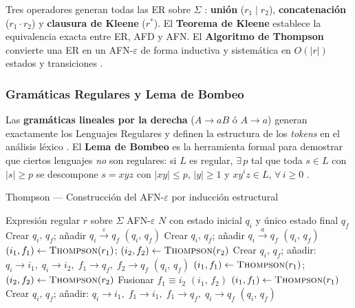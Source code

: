 Tres operadores generan todas las ER sobre $\Sigma$ \cite{kelley2001}: \textbf{unión}
($r_1 \mid r_2$), \textbf{concatenación} ($r_1 \cdot r_2$) y \textbf{clausura de Kleene} ($r^*$).
El \textbf{Teorema de Kleene} establece la equivalencia exacta entre ER, AFD y AFN. El
\textbf{Algoritmo de Thompson} convierte una ER en un AFN-$\varepsilon$ de forma inductiva y
sistemática en $O(|r|)$ estados y transiciones \cite{hopcroft2007es}.

\subsubsection*{Gramáticas Regulares y Lema de Bombeo}

Las \textbf{gramáticas lineales por la derecha} ($A \to aB$ ó $A \to a$) generan exactamente los
Lenguajes Regulares y definen la estructura de los \emph{tokens} en el análisis léxico
\cite{decastro2004}. El \textbf{Lema de Bombeo} es la herramienta formal para demostrar que
ciertos lenguajes \emph{no} son regulares: si $L$ es regular, $\exists\,p$ tal que toda
$s \in L$ con $|s| \geq p$ se descompone $s = xyz$ con $|xy| \leq p$, $|y| \geq 1$ y
$xy^iz \in L$, $\forall\, i \geq 0$ \cite{sipser2012}.

\newpage
\begin{algobox}{Thompson — Construcción del AFN-$\varepsilon$ por inducción estructural}
\begin{algorithmic}[1]
  \Require Expresión regular $r$ sobre $\Sigma$
  \Ensure  AFN-$\varepsilon$ $N$ con estado inicial $q_i$ y único estado final $q_f$
  \State
      \State Crear $q_i,\,q_f$;\; añadir $q_i \xrightarrow{\varepsilon} q_f$
      \State \Return $(q_i,\, q_f)$
      \State Crear $q_i,\,q_f$;\; añadir $q_i \xrightarrow{a} q_f$
      \State \Return $(q_i,\, q_f)$
     
      \State $(i_1,f_1) \gets \Call{Thompson}{r_1}$;\;
             $(i_2,f_2) \gets \Call{Thompson}{r_2}$
      \State Crear $q_i,\,q_f$;\; añadir:
             $q_i\!\to\!i_1,\; q_i\!\to\!i_2,\; f_1\!\to\!q_f,\; f_2\!\to\!q_f$
      \State \Return $(q_i,\, q_f)$
     
      \State $(i_1,f_1) \gets \Call{Thompson}{r_1}$;\;
             $(i_2,f_2) \gets \Call{Thompson}{r_2}$
      \State Fusionar $f_1 \equiv i_2$
      \State \Return $(i_1,\, f_2)$
     
      \State $(i_1,f_1) \gets \Call{Thompson}{r_1}$
      \State Crear $q_i,\,q_f$;\; añadir:
             $q_i\!\to\!i_1,\; f_1\!\to\!i_1,\; f_1\!\to\!q_f,\; q_i\!\to\!q_f$
      \State \Return $(q_i,\, q_f)$
    \EndIf
  \EndFunction
  \State
  \State \Return {}
  \State {}
\end{algorithmic}
\end{algobox}

